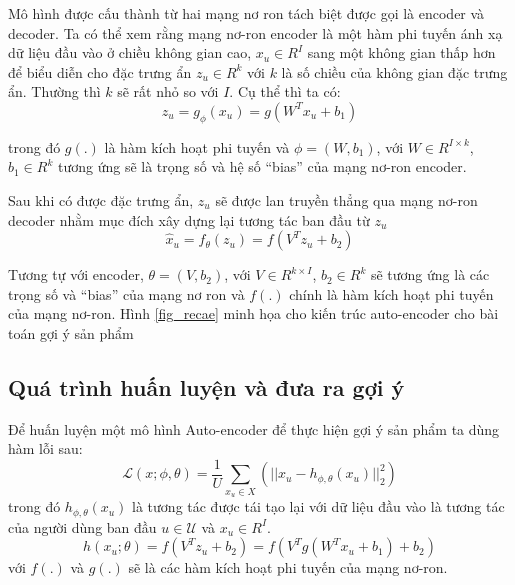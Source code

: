     Mô hình được cấu thành từ hai mạng nơ ron tách biệt được gọi là encoder và decoder. 
    Ta có thể xem rằng mạng nơ-ron encoder là một hàm phi tuyến ánh xạ dữ liệu đầu vào ở chiều không gian cao, $x_u \in R^I$ sang một không gian thấp hơn để biểu diễn cho đặc trưng ẩn $z_u \in R^k$ với $k$ là số chiều của không gian đặc trưng ẩn. 
    Thường thì $k$ sẽ rất nhỏ so với $I$. Cụ thể thì ta có:
    \begin{equation}
        z_u = g_\phi(x_u) = g(W^T x_u + b_1)
    \end{equation}

  
    trong đó $g(.)$ là hàm kích hoạt phi tuyến và $\phi = (W,b_1)$, với $W\in R^{I\times k}$, $b_1 \in R^{k}$ tương ứng sẽ là trọng số và hệ số ``bias'' của mạng nơ-ron encoder. 

    Sau khi có được đặc trưng ẩn, $z_u$ sẽ được lan truyền thẳng qua mạng nơ-ron decoder nhằm mục đích xây dựng lại tương tác ban đầu từ $z_u$
    \begin{equation}
        \widehat{x}_u = f_\theta(z_u) = f(V^T z_u + b_2)
    \end{equation}

    Tương tự với encoder, $\theta = (V,b_2)$, với $V\in R^{k\times I}$, $b_2 \in R^{k}$  sẽ tương ứng là các trọng số và ``bias'' của mạng nơ ron và $f(.)$ chính là hàm kích hoạt phi tuyến của mạng nơ-ron.
    Hình \ref{fig_recae} minh họa cho kiến trúc auto-encoder cho bài toán gợi ý sản phẩm

    \subsection{Quá trình huấn luyện và đưa ra gợi ý}
    
    Để huấn luyện một mô hình Auto-encoder để thực hiện gợi ý sản phẩm ta dùng hàm lỗi sau:
    \begin{equation}
        \label{ae_rec_loss}
        \mathcal{L}(x;\phi,\theta) = \frac {1}{U}\sum_{x_u \in X}(||x_u - h_{\phi,\theta}(x_u)||^2_2)
    \end{equation}
    trong đó $h_{\phi,\theta}(x_u)$ là tương tác được tái tạo lại với dữ liệu đầu vào là tương tác của người dùng ban đầu $u \in \mathcal{U}$ và $x_u \in R^I$.
    \begin{equation}
        h(x_u;\theta) = f(V^T z_u+ b_2) = f(V^T g(W^T x_u + b_1) + b_2)
    \end{equation}    
    với $f(.)$ và $g(.)$ sẽ là các hàm kích hoạt phi tuyến của mạng nơ-ron.
    
